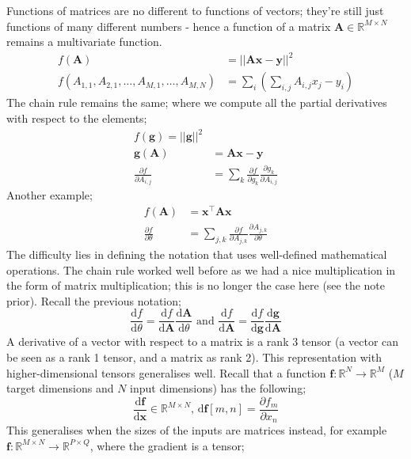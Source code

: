\documentclass[a4paper, 12pt]{article}
\newcommand{\pdif}[2]{\frac{\partial #1}{\partial #2}}
\newcommand{\dif}[2]{\frac{\mathrm{d}#1}{\mathrm{d}#2}}
\newcommand{\summation}[2]{\sum\limits_{#1}^{#2}}
\newcommand{\mat}[1]{\boldsymbol{#1}}
\renewcommand{\vec}[1]{\boldsymbol{#1}}
\begin{document}
            Functions of matrices are no different to functions of vectors; they're still just functions of many different numbers - hence a function of a matrix $\mat{A} \in \mathbb{R}^{M \times N}$ remains a multivariate function.
            \begin{align*}
                f(\mat{A}) & = || \mat{A}\vec{x} - \vec{y} ||^2 \\
                f(A_{1, 1}, A_{2, 1}, \dots, A_{M, 1}, \dots, A_{M, N}) & = \summation{i}{} \left(\summation{i,j}{} A_{i, j} x_j - y_i\right)
            \end{align*}
            The chain rule remains the same; where we compute all the partial derivatives with respect to the elements;
            \begin{align*}
                f(\vec{g}) = || \vec{g} ||^2 \\
                \vec{g}(\mat{A}) & = \mat{A}\vec{x} - \vec{y} \\
                \pdif{f}{A_{i, j}} & = \summation{k}{} \pdif{f}{g_k} \pdif{g_k}{A_{i, j}}
            \end{align*}
            Another example;
            \begin{align*}
                f(\mat{A}) & = \vec{x}^\top\mat{A}\vec{x} \\
                \pdif{f}{\theta} & = \summation{j,k}{} \pdif{f}{A_{j, k}} \pdif{A_{j, k}}{\theta}
            \end{align*}
            The difficulty lies in defining the notation that uses well-defined mathematical operations.
            The chain rule worked well before as we had a nice multiplication in the form of matrix multiplication; this is no longer the case here (see the note prior).
            Recall the previous notation;
            $$\dif{f}{\theta} = \dif{f}{\mat{A}} \dif{\mat{A}}{\theta} \text{ and } \dif{f}{\mat{A}} = \dif{f}{\vec{g}} \dif{\vec{g}}{\mat{A}}$$
            A derivative of a vector with respect to a matrix is a rank 3 tensor (a vector can be seen as a rank 1 tensor, and a matrix as rank 2).
            This representation with higher-dimensional tensors generalises well.
            Recall that a function $\vec{f} : \mathbb{R}^N \to \mathbb{R}^M$ ($M$ target dimensions and $N$ input dimensions) has the following;
            $$\dif{\vec{f}}{\vec{x}} \in \mathbb{R}^{M \times N}\text{,\ \ \ \ } \mathrm{d}\vec{f}[m, n] = \pdif{f_m}{x_n}$$
            This generalises when the sizes of the inputs are matrices instead, for example $\mat{f} : \mathbb{R}^{M \times N} \to \mathbb{R}^{P \times Q}$, where the gradient is a tensor;
\end{document}
